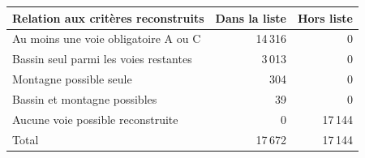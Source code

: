 \begin{tabularx}{\linewidth}{Xrr}
\toprule
Relation aux critères reconstruits & Dans la liste & Hors liste \\
\midrule
Au moins une voie obligatoire A ou C & 14\,316 & 0 \\
Bassin seul parmi les voies restantes & 3\,013 & 0 \\
Montagne possible seule & 304 & 0 \\
Bassin et montagne possibles & 39 & 0 \\
Aucune voie possible reconstruite & 0 & 17\,144 \\
Total & 17\,672 & 17\,144 \\
\bottomrule
\end{tabularx}
